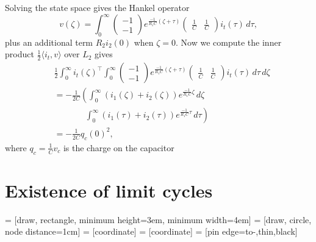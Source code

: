 Solving the state space gives the Hankel operator
\begin{equation}
    v(\zeta) = \int_{0}^{\infty} 
    \begin{pmatrix}
        -1 \\ -1
    \end{pmatrix}
    e^{\frac{-1}{R_1C}(\zeta +\tau)}
    \begin{pmatrix}
        \frac{1}{C} & \frac{1}{C}
    \end{pmatrix}
    i_t(\tau) \, d\tau,
\end{equation}
plus an additional term $R_2i_2(0)$ when $\zeta = 0$. Now we compute the inner product $\frac{1}{2}\langle i_t, v \rangle$ over $L_2$ gives
\begin{equation}
    \begin{split}
        & \frac{1}{2}
        \int_{0}^{\infty} i_t(\zeta)^{\top}
        \int_{0}^{\infty} 
        \begin{pmatrix}
            -1 \\ -1
        \end{pmatrix}
        e^{\frac{-1}{R_1C}(\zeta + \tau)}
        \begin{pmatrix}
        \frac{1}{C} & \frac{1}{C}
        \end{pmatrix}
        i_t(\tau) 
        \, d\tau
        \, d\zeta \\
        &= -\frac{1}{2C}\left( \int_{0}^{\infty} (i_1(\zeta) + i_2(\zeta))e^{\frac{-1}{R_1C}\zeta} \, d\zeta \right.\\
        &\left. \qquad \quad \ \  \ \int_{0}^{\infty} (i_1(\tau) + i_2(\tau))e^{\frac{-1}{R_1C}\tau} \, d\tau \right)\\
        & = -\frac{1}{2C}q_c(0)^2 ,
    \end{split}
\end{equation}
where $q_c = \frac{1}{C}v_c$ is the charge on the capacitor






\section{Existence of limit cycles}
 = [draw, rectangle, 
    minimum height=3em, minimum width=4em]
 = [draw, circle, node distance=1cm]
 = [coordinate]
 = [coordinate]
 = [pin edge={to-,thin,black}]

